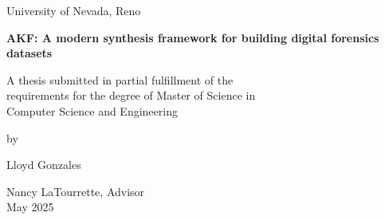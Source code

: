 \documentclass[letterpaper,12pt]{report}
\begin{document}

\newpage
\thispagestyle{empty}
\singlespacing

\begin{center}

\null

\vspace{1.5in}

University of Nevada, Reno \\

\vspace{1.5in}

\textbf{AKF: A modern synthesis framework for building digital forensics datasets}

\vspace{1.5in}

A thesis submitted in partial fulfillment of the\\
requirements for the degree of Master of Science in\\
Computer Science and Engineering\\

\vspace{1in}

by

\vspace{0.25in}
Lloyd Gonzales
\vspace{0.5in}

Nancy LaTourrette, Advisor \\
May 2025\\

\end{center}


\setcounter{page}{0}

\newpage
\onehalfspace
\end{document}
